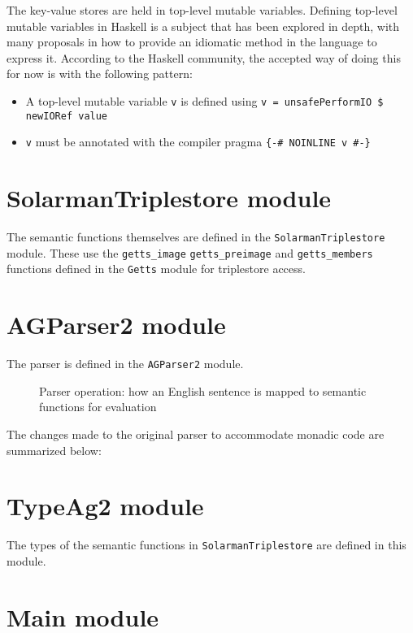 \documentclass[../main.tex]{subfiles}
\begin{document}
	The key-value stores are held in top-level mutable variables.  Defining top-level mutable variables in Haskell is a subject that has been explored in depth, with many proposals in how to provide an idiomatic method in the language to express it.  According to the Haskell community, the accepted way of doing this for now is with the following pattern:
	
	\begin{itemize}
		\item A top-level mutable variable \texttt{v} is defined using \texttt{v = unsafePerformIO \$ newIORef value} 
		\item \texttt{v} must be annotated with the compiler pragma \texttt{\{\--\# NOINLINE v \#\--\}}
	\end{itemize}
	
	
\section{SolarmanTriplestore module}

The semantic functions themselves are defined in the \texttt{SolarmanTriplestore} module.  These use the \texttt{getts\_image} \texttt{getts\_preimage} and \texttt{getts\_members} functions defined in the \texttt{Getts} module for triplestore access.

\section{AGParser2 module}

The parser is defined in the \texttt{AGParser2} module.

\begin{figure}[h]
	\centering
	\caption{Parser operation: how an English sentence is mapped to semantic functions for evaluation \cite{graphmqslide}}
\end{figure}

The changes made to the original parser to accommodate monadic code are summarized below:

\section{TypeAg2 module}

The types of the semantic functions in \texttt{SolarmanTriplestore} are defined in this module.  

\section{Main module}
\end{document}
